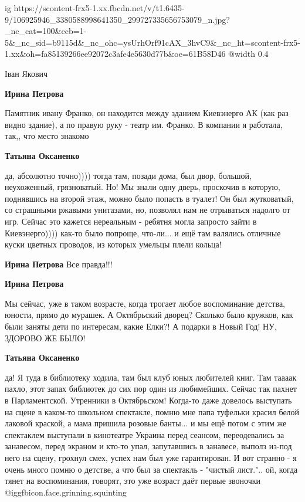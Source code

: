  
 
 
 
 

\ifcmt
  ig https://scontent-frx5-1.xx.fbcdn.net/v/t1.6435-9/106925946_3380588998641350_299727335656753079_n.jpg?_nc_cat=100&ccb=1-5&_nc_sid=b9115d&_nc_ohc=ysUrhOrf91cAX_3hvC9&_nc_ht=scontent-frx5-1.xx&oh=fa85139266ee92072c3afe4e5630d77b&oe=61B58D46
  @width 0.4
\fi

Іван Якович

\textbf{Ирина Петрова} 

Памятник ивану Франко, он находится между зданием Киевэнерго АК (как раз видно
здание), а по правую руку - театр им. Франко. В компании я работала, так,, что
место знакомо

\textbf{Татьяна Оксаненко} 

да, абсолютно точно)))) тогда там, позади дома, был двор, большой, неухоженный,
грязноватый. Но! Мы знали одну дверь, проскочив в которую, поднявшись на второй
этаж, можно было попасть в туалет! Он был жутковатый, со страшными ржавыми
унитазами, но, позволял нам не отрываться надолго от игр. Сейчас это кажется
нереальным - ребятня могла запросто зайти в Киевэнерго)))) как-то было попроще,
что-ли... и ещё там валялись отличные куски цветных проводов, из которых
умельцы плели кольца!

\textbf{Ирина Петрова} Все правда!!!

\textbf{Ирина Петрова} 

Мы сейчас, уже в таком возрасте, когда трогает любое воспоминание
детства, юности, прямо до мурашек. А Октябрьский дворец? Сколько было кружков, как
были заняты дети по интересам, какие Елки?! А подарки в Новый Год! НУ, ЗДОРОВО ЖЕ
БЫЛО!

\textbf{Татьяна Оксаненко} 

да! Я туда в библиотеку ходила, там был клуб юных любителей книг. Там таааак
пахло, этот запах библиотек до сих пор один из любимейших. Сейчас так пахнет в
Парламентской. Утренники в Октябрьском! Когда-то даже довелось выступать на
сцене в каком-то школьном спектакле, помню мне папа туфельки красил белой
лаковой краской, а мама пришила розовые банты... и мы ещё потом с этим же
спектаклем выступали в кинотеатре Украина перед сеансом, переодевались за
занавесом, перед экраном и кто-то упал, запутавшись в занавесе, выполз из-под
него на сцену, грохнул смех, успех нам был уже гарантирован. И вот странно - я
очень много помню о детстве, а что был за спектакль - "чистый лист.".. ой,
когда тянет на воспоминания, говорят, это уже возраст даёт первые звоночки @igg{fbicon.face.grinning.squinting} 


